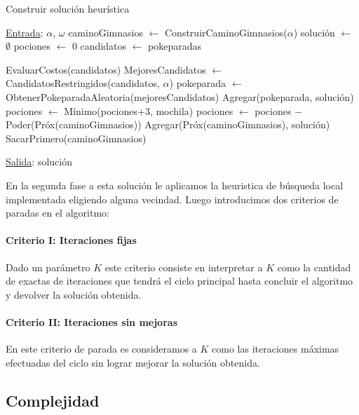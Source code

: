 \begin{algorithm}[H]

\label{}
\caption{Construir soluci\'on heur\'istica}

\begin{algorithmic}[1]

\Statex \underline{Entrada}: $\alpha$, $\omega$
\medskip
\State caminoGimnasios $\gets$ ConstruirCaminoGimnasios($\alpha$)
\State soluci\'on $\gets$ $\emptyset$
\State pociones $\gets$ $0$
\State candidatos $\gets$ pokeparadas

		\State EvaluarCostos(candidatos)
		\State MejoresCandidatos $\gets$ CandidatosRestringidos(candidatos, $\alpha$)
		\State pokeparada $\gets$ ObtenerPokeparadaAleatoria(mejoresCandidatos)
		\State Agregar(pokeparada, soluci\'on)
		\State pociones $\gets$ M\'inimo(pociones$+3$, mochila)
	\EndWhile
	\State pociones $\gets$  pociones $-$ Poder(Pr\'ox(caminoGimnasios))
	\State  Agregar(Pr\'ox(caminoGimnasios), soluci\'on)
	\State  SacarPrimero(caminoGimnasios)
\EndWhile

\medskip
\Statex \underline{Salida}: soluci\'on

\end{algorithmic}
\end{algorithm}

En la segunda fase a esta solución le aplicamos la heuristica de búsqueda local implementada eligiendo alguna vecindad. Luego introducimos dos criterios de paradas en el algoritmo:

\paragraph{Criterio I: Iteraciones fijas}
Dado un parámetro $K$ este criterio consiste en interpretar a $K$ como la cantidad de exactas de iteraciones que tendrá el ciclo principal hasta concluir el algoritmo y devolver la solución obtenida.

\paragraph{Criterio II: Iteraciones sin mejoras}
En este criterio de parada es consideramos a $K$ como las iteraciones máximas efectuadas del ciclo sin lograr mejorar la solución obtenida.


\subsection{Complejidad}

